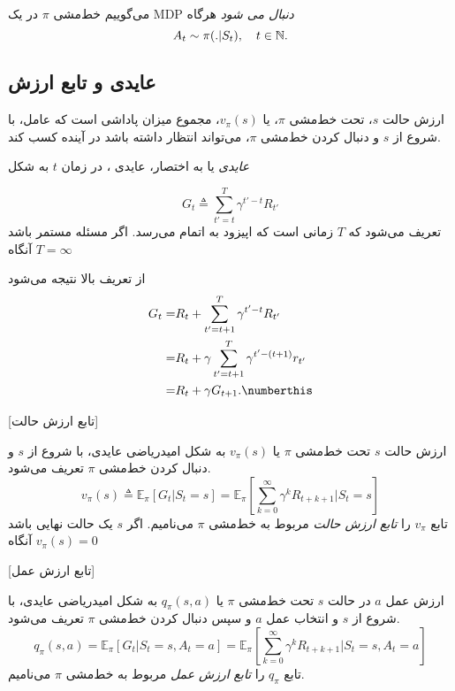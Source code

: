 
می‌گوییم خط‌مشی $\pi$ در یک
 MDP
  \textit{دنبال می
  	\nf
  	 شود}
   هرگاه
$$A_t \sim \pi(. |S_t),	 \quad t \in \mathbb{N}.$$




\subsection{عایدی و تابع ارزش}

ارزش حالت $s$، تحت خط‌مشی $\pi$، یا
 $v_\pi(s)$،
مجموع میزان پاداشی است که عامل، با شروع از $s$ و دنبال کردن خط‌مشی $\pi$، می‌تواند انتظار داشته باشد در آینده کسب کند.

\textit{عایدی}
 یا به اختصار، عایدی ، در زمان $t$ به شکل

$$G_t \triangleq \sum_{t'=t}^{T} \gamma^{t'-t} R_{t'}$$
تعریف می‌شود که $T$ زمانی است که اپیزود به اتمام می‌رسد. اگر مسئله مستمر باشد آنگاه 
$T=\infty$

از تعریف بالا نتیجه می‌شود 
\begin{align}
G_t =& R_t + \sum_{t'=t+1}^{T} \gamma^{t'-t} R_{t'} \nonumber \\
=& R_t + \gamma \sum_{t'=t+1}^{T} \gamma^{t' - (t+1)} r_{t'} \nonumber \\
=& R_t + \gamma G_{t+1}. \numberthis
\end{align}

[تابع ارزش حالت]

 ارزش حالت $s$ تحت خط‌مشی $\pi$ یا $v_\pi(s)$ به شکل امیدریاضی عایدی، با شروع از $s$ و دنبال کردن خط‌مشی $\pi$ تعریف می‌شود.
$$v_\pi(s) \triangleq \mathbb{E}_\pi\left[G_t| S_t=s\right] = \mathbb{E}_\pi\left[\sum_{k=0}^{\infty} \gamma^k R_{t+k+1}|S_t =s \right]$$
تابع $v_\pi$ را 
\textit{تابع ارزش حالت}
 مربوط به خط‌مشی 
$\pi$
می‌نامیم. اگر $s$ یک حالت نهایی باشد آنگاه 
$v_\pi(s) = 0$

\label{statevaluedef}

[تابع ارزش عمل]

ارزش عمل  $a$ در حالت
$s$
 تحت خط‌مشی $\pi$ یا 
 $q_\pi(s,a)$
  به شکل امیدریاضی عایدی، با شروع از $s$ و انتخاب عمل $a$  و سپس دنبال کردن خط‌مشی $\pi$ تعریف می‌شود.
$$q_\pi(s,a) = \mathbb{E}_\pi\left[G_t| S_t=s, A_t=a\right] = \mathbb{E}_\pi\left[\sum_{k=0}^{\infty} \gamma^k R_{t+k+1}|S_t =s, A_t=a \right]$$
تابع $q_\pi$ را 
\textit{تابع ارزش عمل}
 مربوط به خط‌مشی 
$\pi$
می‌نامیم.
